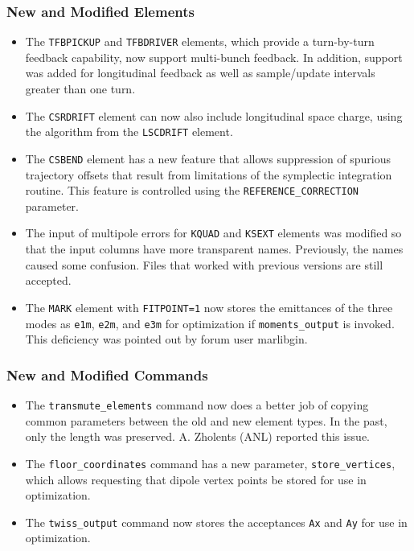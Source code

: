 \documentclass[11pt]{article}
\begin{document}
\subsubsection{New and Modified Elements}
\begin{itemize}
\item The \verb|TFBPICKUP| and \verb|TFBDRIVER| elements, which provide a turn-by-turn feedback capability, now support multi-bunch feedback.
  In addition, support was added for longitudinal feedback as well as sample/update intervals greater than one turn.
\item The \verb|CSRDRIFT| element can now also include longitudinal space charge, using the algorithm from the \verb|LSCDRIFT| element.
\item The \verb|CSBEND| element has a new feature that allows suppression of spurious trajectory offsets that result from limitations
  of the symplectic integration routine. This feature is controlled using the \verb|REFERENCE_CORRECTION| parameter. 
\item The input of multipole errors for \verb|KQUAD| and \verb|KSEXT| elements was modified so that the input columns have more transparent
  names. Previously, the names caused some confusion. Files that worked with previous versions are still accepted.
\item The \verb|MARK| element with \verb|FITPOINT=1| now stores the emittances of the three modes as \verb|e1m|, 
  \verb|e2m|, and \verb|e3m| for optimization if \verb|moments_output| is invoked. This deficiency was pointed out
  by forum user marlibgin.
\end{itemize}

\subsubsection{New and Modified Commands}
\begin{itemize}
\item The \verb|transmute_elements| command now does a better job of copying common parameters between the old and new element types.
  In the past, only the length was preserved. A. Zholents (ANL) reported this issue.
\item The \verb|floor_coordinates| command has a new parameter, \verb|store_vertices|, which allows requesting that dipole vertex points
  be stored for use in optimization.
\item The \verb|twiss_output| command now stores the acceptances \verb|Ax| and \verb|Ay| for use in optimization.
\end{itemize}
\end{document}
